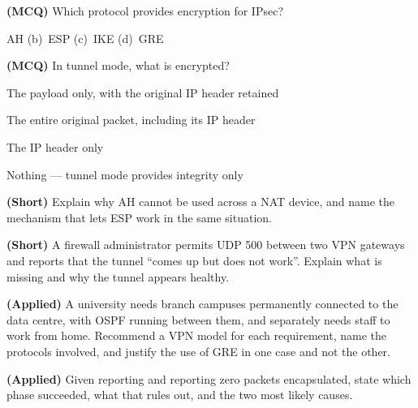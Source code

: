 \begin{reviewq}
  \item \textbf{(MCQ)} Which protocol provides encryption for IPsec?
        \begin{tight}
          \item[(a)] AH \quad (b)~ESP \quad (c)~IKE \quad (d)~GRE
        \end{tight}
  \item \textbf{(MCQ)} In tunnel mode, what is encrypted?
        \begin{tight}
          \item[(a)] The payload only, with the original IP header retained
          \item[(b)] The entire original packet, including its IP header
          \item[(c)] The IP header only
          \item[(d)] Nothing --- tunnel mode provides integrity only
        \end{tight}
  \item \textbf{(Short)} Explain why AH cannot be used across a NAT device, and
        name the mechanism that lets ESP work in the same situation.
  \item \textbf{(Short)} A firewall administrator permits UDP 500 between two VPN
        gateways and reports that the tunnel ``comes up but does not work''.
        Explain what is missing and why the tunnel appears healthy.
  \item \textbf{(Applied)} A university needs branch campuses permanently
        connected to the data centre, with OSPF running between them, and
        separately needs staff to work from home. Recommend a VPN model for each
        requirement, name the protocols involved, and justify the use of GRE in
        one case and not the other.
  \item \textbf{(Applied)} Given  reporting
         and  reporting zero packets
        encapsulated, state which phase succeeded, what that rules out, and the
        two most likely causes.
\end{reviewq}
